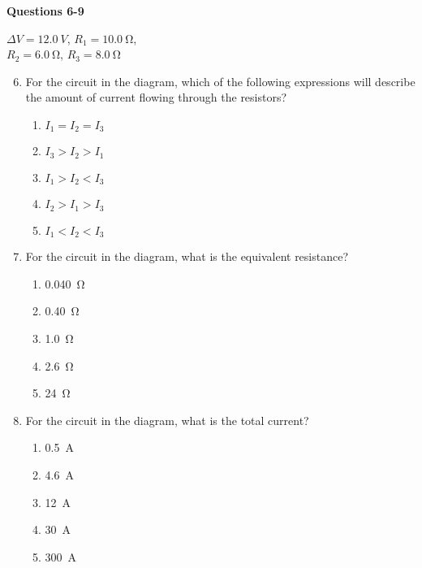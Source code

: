 \documentclass[11pt]{article}
\begin{document}
\begin{multicols}{2}
  \textbf{Questions 6-9}
  \begin{center}
    
    \vspace{.1in}$\Delta V=\SI{12.0}{V}$, $R_1=\SI{10.0}{\ohm}$,\\
    $R_2=\SI{6.0}{\ohm}$, $R_3=\SI{8.0}{\ohm}$
  \end{center}

  \begin{enumerate}[leftmargin=18pt]
    \setcounter{enumi}{5}

  \item For the circuit in the diagram, which of the following expressions will
    describe the amount of current flowing through the resistors?
    \begin{enumerate}[noitemsep,topsep=0pt,leftmargin=18pt,label=(\Alph*)]
    \item $I_1=I_2=I_3$
    \item $I_3>I_2>I_1$
    \item $I_1>I_2<I_3$
    \item $I_2>I_1>I_3$
    \item $I_1<I_2<I_3$
    \end{enumerate}
    
  \item For the circuit in the diagram, what is the equivalent resistance?
    \begin{enumerate}[noitemsep,topsep=0pt,leftmargin=18pt,label=(\Alph*)]
      \item\SI{0.040}{\ohm}
      \item\SI{0.40}{\ohm}
      \item\SI{1.0}{\ohm}
      \item\SI{2.6}{\ohm}
      \item\SI{24}{\ohm}
    \end{enumerate}
    
  \item For the circuit in the diagram, what is the total current?
    \begin{enumerate}[noitemsep,topsep=0pt,leftmargin=18pt,label=(\Alph*)]
    \item\SI{0.5}{A}
    \item\SI{4.6}{A}
    \item\SI{12}{A}
    \item\SI{30}{A}
    \item\SI{300}{A}
    \end{enumerate}
    

\end{enumerate}
\end{multicols}
\end{document}
